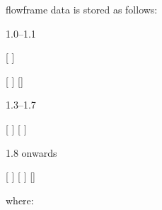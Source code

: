 \Gls{flowframe} data is stored as
follows:
\begin{jdrversion}{1.0--1.1}
\begin{syntaxline}
 [  ]
   
\end{syntaxline}
\end{jdrversion}
\begin{jdrversion}{1.2}
\begin{syntaxline}
 [  ]
   
[]
\end{syntaxline}
\end{jdrversion}
\begin{jdrversion}{1.3--1.7}
\begin{syntaxline}
 [  ]
   
[ ]
\end{syntaxline}
\end{jdrversion}
\begin{jdrversion}{1.8 onwards}
\begin{syntaxline}
 [  ]
   
[  ] 
[]
\end{syntaxline}
\end{jdrversion}
where:
